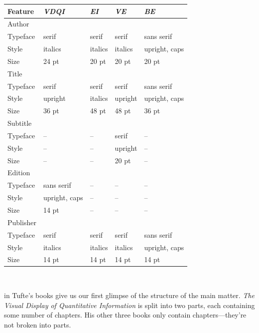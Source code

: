 \documentclass{tufte-book} %
\newcommand{\na}{\quad--} %
\newcommand{\vdqi}{\textit{VDQI}\xspace}
\newcommand{\ei}{\textit{EI}\xspace}
\newcommand{\ve}{\textit{VE}\xspace}
\newcommand{\be}{\textit{BE}\xspace}
\newcommand{\VDQI}{\textit{The Visual Display of Quantitative Information}\xspace}
\begin{document}
\bigskip
\begin{center}
\footnotesize
\begin{tabular}{lllll}
\toprule
Feature & \vdqi & \ei & \ve & \be \\
\midrule
Author & & & & \\
\quad Typeface & serif & serif & serif & sans serif \\
\quad Style & italics & italics & italics & upright, caps \\
\quad Size & 24 pt & 20 pt & 20 pt & 20 pt \\
\addlinespace
Title & & & & \\
\quad Typeface & serif & serif & serif & sans serif \\
\quad Style & upright & italics & upright & upright, caps \\
\quad Size & 36 pt & 48 pt & 48 pt & 36 pt \\
\addlinespace
Subtitle & & & & \\
\quad Typeface & \na & \na & serif & \na \\
\quad Style & \na & \na & upright & \na \\
\quad Size & \na & \na & 20 pt & \na \\
\addlinespace
Edition & & & & \\
\quad Typeface & sans serif & \na & \na & \na \\
\quad Style & upright, caps & \na & \na & \na \\
\quad Size & 14 pt & \na & \na & \na \\
\addlinespace
Publisher & & & & \\
\quad Typeface & serif & serif & serif & sans serif \\
\quad Style & italics & italics & italics & upright, caps \\
\quad Size & 14 pt & 14 pt & 14 pt & 14 pt \\
\bottomrule
\end{tabular}
\end{center}

\begin{figure}[p]
\hfill
{}
\\\vspace{\baselineskip}
\hfill
{}
\end{figure}

 in Tufte's books give us our first glimpse of the structure of the main matter. \VDQI is split into two parts, each containing some number of chapters. His other three books only contain chapters---they're not broken into parts.
\end{document}
